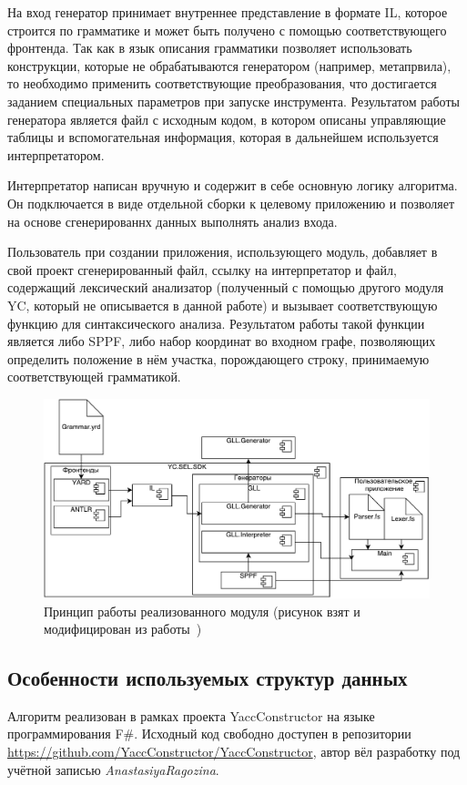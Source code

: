 \documentclass[14pt]{matmex-diploma}
\begin{document}
На вход генератор принимает внутреннее представление в формате IL, которое строится по грамматике и может быть получено с помощью соответствующего фронтенда. Так как в язык описания грамматики позволяет использовать конструкции, которые не обрабатываются генератором (например, метапрвила), то необходимо применить соответствующие преобразования, что достигается заданием специальных параметров при запуске инструмента. Результатом работы генератора является файл с исходным кодом, в котором описаны управляющие таблицы и вспомогательная информация, которая в дальнейшем используется интерпретатором. 

Интерпретатор написан вручную и содержит в себе основную логику алгоритма. Он подключается в виде отдельной сборки к целевому приложению и позволяет на основе сгенерированнх данных выполнять анализ входа.

Пользователь при создании приложения, использующего модуль, добавляет в свой проект сгенерированный файл, ссылку на интерпретатор и файл, содержащий лексический анализатор (полученный с помощью другого модуля YC, который не описывается в данной работе) и вызывает соответствующую функцию для синтаксического анализа. Результатом работы такой функции является либо SPPF, либо набор координат во входном графе, позволяющих определить положение в нём участка, порождающего строку, принимаемую соответствующей грамматикой.

\begin{figure}
 \centering
 \includegraphics[width=15cm]{pics/GLL_Proc.pdf}
 \caption{Принцип работы реализованного модуля (рисунок взят и модифицирован из работы~\cite{GrigorievPhd})}
 \label{Arch2}
\end{figure}

\subsection{Особенности используемых структур данных}
Алгоритм реализован в рамках проекта YaccConstructor на языке программирования F\#. Исходный код свободно доступен в репозитории \url{https://github.com/YaccConstructor/YaccConstructor}, автор вёл разработку под учётной записью {\it AnastasiyaRagozina}.
\end{document}
